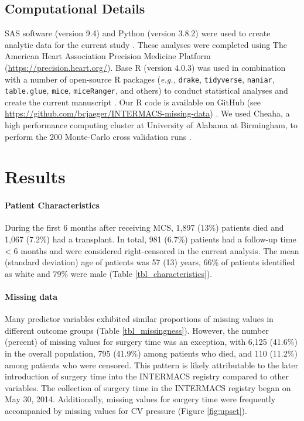 \documentclass{article}
\begin{document}
\hypertarget{computational-details}{%
\subsection{Computational Details}\label{computational-details}}

\label{subsec:computing}

SAS software (version 9.4) and Python (version 3.8.2) were used to
create analytic data for the current study
\cite{van1995python, sas2013}. These analyses were completed using The
American Heart Association Precision Medicine Platform
(\url{https://precision.heart.org/}). Base R (version 4.0.3) was used in
combination with a number of open-source R packages
(\textit{e.g., } \texttt{drake}, \texttt{tidyverse}, \texttt{naniar},
\texttt{table.glue}, \texttt{mice}, \texttt{miceRanger}, and others) to
conduct statistical analyses and create the current manuscript
\cite{drake, naniar, mice, miceRanger, table.glue, tidyverse, rstanarm, tidybayes, survival, tidymodels, riskRegression}.
Our R code is available on GitHub (see
\url{https://github.com/bcjaeger/INTERMACS-missing-data})
\cite{byron_2020_4247449}. We used Cheaha, a high performance computing
cluster at University of Alabama at Birmingham, to perform the 200
Monte-Carlo cross validation runs \cite{cheaha}.

\hypertarget{results}{%
\section{Results}\label{results}}

\paragraph{Patient Characteristics}

During the first 6 months after receiving MCS, 1,897 (13\%) patients
died and 1,067 (7.2\%) had a transplant. In total, 981 (6.7\%) patients
had a follow-up time \textless{} 6 months and were considered
right-censored in the current analysis. The mean (standard deviation)
age of patients was 57 (13) years, 66\% of patients identified as white
and 79\% were male (Table \ref{tbl_characteristics}).

\paragraph{Missing data}

Many predictor variables exhibited similar proportions of missing values
in different outcome groups (Table \ref{tbl_missingness}). However, the
number (percent) of missing values for surgery time was an exception,
with 6,125 (41.6\%) in the overall population, 795 (41.9\%) among
patients who died, and 110 (11.2\%) among patients who were censored.
This pattern is likely attributable to the later introduction of surgery
time into the INTERMACS registry compared to other variables. The
collection of surgery time in the INTERMACS registry began on May 30,
2014. Additionally, missing values for surgery time were frequently
accompanied by missing values for CV pressure (Figure \ref{fig:upset}).
\end{document}

